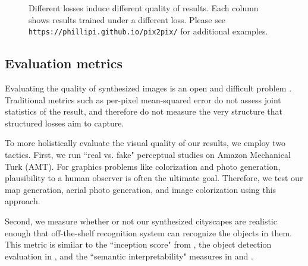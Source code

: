 \documentclass[10pt,twocolumn,letterpaper]{article}
\begin{document}
\begin{figure*}[t]
\begin{center}
\begin{tabular}{ccccc}
\end{tabular} \egroup 
\end{center}
\vspace{-0.2in}
\caption{Different losses induce different quality of results. Each column shows results trained under a different loss. Please see \texttt{https://phillipi.github.io/pix2pix/} for additional examples.}
\label{cityscapes_loss_variations_qualitative}
\vspace{-0.2in}
\end{figure*} 


\subsection{Evaluation metrics}
Evaluating the quality of synthesized images is an open and difficult problem \cite{salimans2016improved}. Traditional metrics such as per-pixel mean-squared error do not assess joint statistics of the result, and therefore do not measure the very structure that structured losses aim to capture.

To more holistically evaluate the visual quality of our results, we employ two tactics. First, we run ``real vs. fake" perceptual studies on Amazon Mechanical Turk (AMT). For graphics problems like colorization and photo generation, plausibility to a human observer is often the ultimate goal. Therefore, we test our map generation, aerial photo generation, and image colorization using this approach.

Second, we measure whether or not our synthesized cityscapes are realistic enough that off-the-shelf recognition system can recognize the objects in them. This metric is similar to the ``inception score" from \cite{salimans2016improved}, the object detection evaluation in \cite{wang2016generative}, and the ``semantic interpretability" measures in \cite{zhang2016colorful} and \cite{owens2016visually}.
\end{document}
